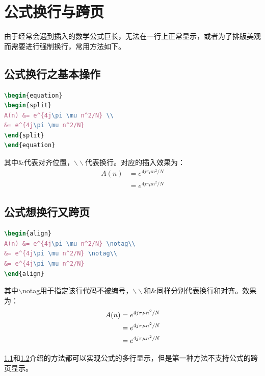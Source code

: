 \section{公式换行与跨页}
由于经常会遇到插入的数学公式巨长，无法在一行上正常显示，或者为了排版美观而需要进行强制换行，常用方法如下。
\subsection{公式换行之基本操作}
\label{sec:公式换行之基本操作}
\vspace{-1cm}
\begin{lstlisting}[language={tex}, caption={结合split和equation环境插入公式}]
\begin{equation}
\begin{split}
A(n) &= e^{4j\pi \mu n^2/N} \\
&= e^{4j\pi \mu n^2/N}
\end{split}
\end{equation}
\end{lstlisting}
其中\&代表对齐位置，$\backslash\backslash$代表换行。对应的插入效果为：
\begin{equation}
\begin{split}
A(n) &= e^{4j\pi \mu n^2/N} \\
&= e^{4j\pi \mu n^2/N}
\end{split}
\end{equation}
\subsection{公式想换行又跨页}
\label{sec:公式想换行又跨页}
\vspace{-1cm}
\begin{lstlisting}[language={tex}, caption={使用align环境插入公式}]
\begin{align}
A(n) &= e^{4j\pi \mu n^2/N} \notag\\
&= e^{4j\pi \mu n^2/N} \notag\\
&= e^{4j\pi \mu n^2/N}
\end{align}
\end{lstlisting}
其中$\backslash$notag用于指定该行代码不被编号，$\backslash\backslash$和\&同样分别代表换行和对齐。效果为：
\begin{align}
A(n) &= e^{4j\pi \mu n^2/N} \notag\\
&= e^{4j\pi \mu n^2/N} \notag\\
&= e^{4j\pi \mu n^2/N}
\end{align}

\ref{sec:公式换行之基本操作}和\ref{sec:公式想换行又跨页}介绍的方法都可以实现公式的多行显示，但是第一种方法不支持公式的跨页显示。

